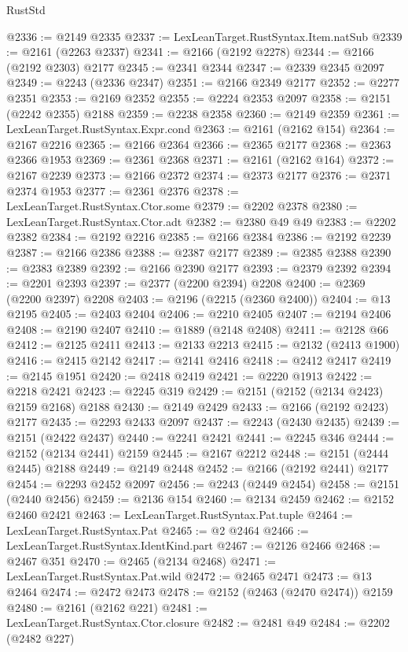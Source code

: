 \begin{lexlean}{RustStd}
\begin{coremodule}
@2336 := @2149 @2335
@2337 := LexLeanTarget.RustSyntax.Item.natSub
@2339 := @2161 (@2263 @2337)
@2341 := @2166 (@2192 @2278)
@2344 := @2166 (@2192 @2303) @2177
@2345 := @2341 @2344
@2347 := @2339 @2345 @2097
@2349 := @2243 (@2336 @2347)
@2351 := @2166 @2349 @2177
@2352 := @2277 @2351
@2353 := @2169 @2352
@2355 := @2224 @2353 @2097
@2358 := @2151 (@2242 @2355) @2188
@2359 := @2238 @2358
@2360 := @2149 @2359
@2361 := LexLeanTarget.RustSyntax.Expr.cond
@2363 := @2161 (@2162 @154)
@2364 := @2167 @2216
@2365 := @2166 @2364
@2366 := @2365 @2177
@2368 := @2363 @2366 @1953
@2369 := @2361 @2368
@2371 := @2161 (@2162 @164)
@2372 := @2167 @2239
@2373 := @2166 @2372
@2374 := @2373 @2177
@2376 := @2371 @2374 @1953
@2377 := @2361 @2376
@2378 := LexLeanTarget.RustSyntax.Ctor.some
@2379 := @2202 @2378
@2380 := LexLeanTarget.RustSyntax.Ctor.adt
@2382 := @2380 @49 @49
@2383 := @2202 @2382
@2384 := @2192 @2216
@2385 := @2166 @2384
@2386 := @2192 @2239
@2387 := @2166 @2386
@2388 := @2387 @2177
@2389 := @2385 @2388
@2390 := @2383 @2389
@2392 := @2166 @2390 @2177
@2393 := @2379 @2392
@2394 := @2201 @2393
@2397 := @2377 (@2200 @2394) @2208
@2400 := @2369 (@2200 @2397) @2208
@2403 := @2196 (@2215 (@2360 @2400))
@2404 := @13 @2195
@2405 := @2403 @2404
@2406 := @2210 @2405
@2407 := @2194 @2406
@2408 := @2190 @2407
@2410 := @1889 (@2148 @2408)
@2411 := @2128 @66
@2412 := @2125 @2411
@2413 := @2133 @2213
@2415 := @2132 (@2413 @1900)
@2416 := @2415 @2142
@2417 := @2141 @2416
@2418 := @2412 @2417
@2419 := @2145 @1951
@2420 := @2418 @2419
@2421 := @2220 @1913
@2422 := @2218 @2421
@2423 := @2245 @319
@2429 := @2151 (@2152 (@2134 @2423) @2159 @2168) @2188
@2430 := @2149 @2429
@2433 := @2166 (@2192 @2423) @2177
@2435 := @2293 @2433 @2097
@2437 := @2243 (@2430 @2435)
@2439 := @2151 (@2422 @2437)
@2440 := @2241 @2421
@2441 := @2245 @346
@2444 := @2152 (@2134 @2441) @2159
@2445 := @2167 @2212
@2448 := @2151 (@2444 @2445) @2188
@2449 := @2149 @2448
@2452 := @2166 (@2192 @2441) @2177
@2454 := @2293 @2452 @2097
@2456 := @2243 (@2449 @2454)
@2458 := @2151 (@2440 @2456)
@2459 := @2136 @154
@2460 := @2134 @2459
@2462 := @2152 @2460 @2421
@2463 := LexLeanTarget.RustSyntax.Pat.tuple
@2464 := LexLeanTarget.RustSyntax.Pat
@2465 := @2 @2464
@2466 := LexLeanTarget.RustSyntax.IdentKind.part
@2467 := @2126 @2466
@2468 := @2467 @351
@2470 := @2465 (@2134 @2468)
@2471 := LexLeanTarget.RustSyntax.Pat.wild
@2472 := @2465 @2471
@2473 := @13 @2464
@2474 := @2472 @2473
@2478 := @2152 (@2463 (@2470 @2474)) @2159
@2480 := @2161 (@2162 @221)
@2481 := LexLeanTarget.RustSyntax.Ctor.closure
@2482 := @2481 @49
@2484 := @2202 (@2482 @227)

\end{coremodule}
\end{lexlean}
